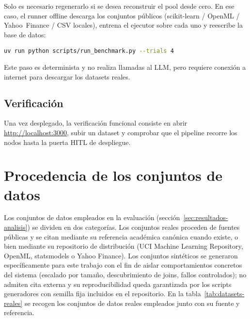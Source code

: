 \documentclass[12pt,a4paper]{article}
\theoremstyle{plain}
\begin{document}
Solo es necesario regenerarlo si se desea reconstruir el pool desde cero. En ese caso, el runner offline descarga los conjuntos públicos
(scikit-learn / OpenML / Yahoo~Finance / CSV locales), entrena el ejecutor sobre cada uno y reescribe la base de datos:

\begin{lstlisting}[language=bash,breaklines=true,breakatwhitespace=true,columns=fullflexible]
uv run python scripts/run_benchmark.py --trials 4
\end{lstlisting}

\noindent
Este paso es determinista y no realiza llamadas al LLM, pero requiere conexión a internet para descargar los datasets reales.

\subsection{Verificación}
\label{anexo:repro-tests}

Una vez desplegado, la verificación funcional consiste en abrir
\url{http://localhost:3000}, subir un dataset y comprobar que el pipeline recorre los nodos hasta la puerta HITL de despliegue.

\newpage

\section{Procedencia de los conjuntos de datos}
\label{anexo:datasets}

Los conjuntos de datos empleados en la evaluación (sección~\ref{sec:resultados-analisis}) se dividen en dos categorías. Los conjuntos reales proceden de fuentes públicas y se citan mediante su referencia académica canónica cuando existe, o bien mediante su repositorio de distribución (UCI Machine Learning Repository, OpenML, statsmodels o Yahoo Finance). Los conjuntos sintéticos se generaron específicamente para este trabajo con el fin de aislar comportamientos concretos del
sistema (escalado por tamaño, descubrimiento de joins, fallos controlados); no admiten cita externa y su reproducibilidad queda garantizada por los scripts
generadores con semilla fija incluidos en el repositorio. En la tabla~\ref{tab:datasets-reales} se recogen los conjuntos de datos reales empleados junto con su fuente y referencia. %
\end{document}
